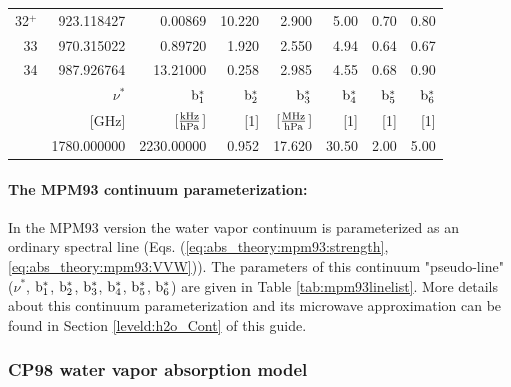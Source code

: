 \begin{longtable}{rrrrrrrr}
32$^+$ & 923.118427 & 0.00869 & 10.220& 2.900 & 5.00 & 0.70 & 0.80 \\
33     & 970.315022 & 0.89720 & 1.920 & 2.550 & 4.94 & 0.64 & 0.67 \\
34     & 987.926764 & 13.21000& 0.258 & 2.985 & 4.55 & 0.68 & 0.90 \\
\hline
 & $\nu^*$ & $\rm b^*_{\rm 1}$ & $\rm b^*_{\rm 2}$ & $\rm b^*_{\rm 3}$ & $\rm b^*_{\rm 4}$ & $\rm b^*_{\rm 5}$ & $\rm b^*_{\rm 6}$\\
 & {\rm [GHz]}  & {[$\frac{\rm kHz}{\rm hPa}$]} & {\rm [1]} & 
 {[$\frac{\rm MHz}{\rm hPa}$]} & {\rm [1]} & {\rm [1]} & {\rm [1]} \\
\hline
 & 1780.000000 & 2230.00000 & 0.952 & 17.620 & 30.50 & 2.00 & 5.00 \\
\end{longtable}



\paragraph{The MPM93 continuum parameterization:}
\label{levele:mpm93:h2ocont}
In the MPM93 version the water vapor continuum is parameterized as an
ordinary spectral line (Eqs. (\ref{eq:abs_theory:mpm93:strength}, 
\ref{eq:abs_theory:mpm93:VVW})). The parameters of this continuum "pseudo-line" 
($\nu^*$, $\rm b^*_{\rm 1}$, $\rm b^*_{\rm 2}$, $\rm b^*_{\rm 3}$, $\rm b^*_{\rm 4}$, $\rm b^*_{\rm 5}$, $\rm b^*_{\rm 6}$) 
are given in Table \ref{tab:mpm93linelist}. More details about 
this continuum parameterization and its microwave approximation can be 
found in Section \ref{leveld:h2o_Cont} of this guide.




\subsubsection{CP98 water vapor absorption model}
\label{leveld:cp98}


